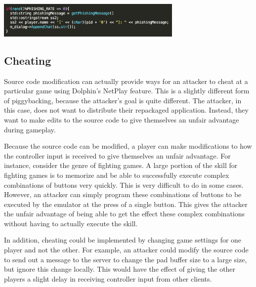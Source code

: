 \documentclass[conference]{IEEEtran}
\begin{document}
\vspace{0.5cm}
\begin{center}
\includegraphics[width=9cm]{Figures/Phishing2}
\end{center}
\vspace{0.5cm}

\subsection{Cheating}
Source code modification can actually provide ways for an attacker to cheat at a particular game using Dolphin's NetPlay feature.
This is a slightly different form of piggybacking, because the attacker's goal is quite different.
The attacker, in this case, does not want to distribute their repackaged application.
Instead, they want to make edits to the source code to give themselves an unfair advantage during gameplay.

Because the source code can be modified, a player can make modifications to how the controller input is received to give themselves an unfair advantage.
For instance, consider the genre of fighting games.
A large portion of the skill for fighting games is to memorize and be able to successfully execute complex combinations of buttons very quickly.
This is very difficult to do in some cases.
However, an attacker can simply program these combinations of buttons to be executed by the emulator at the press of a single button.
This gives the attacker the unfair advantage of being able to get the effect these complex combinations without having to actually execute the skill.

In addition, cheating could be implemented by changing game settings for one player and not the other.
For example, an attacker could modify the source code to send out a message to the server to change the pad buffer size to a large size, but ignore this change locally.
This would have the effect of giving the other players a slight delay in receiving controller input from other clients. 
\end{document}
